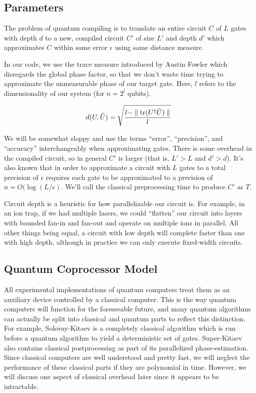 \subsection{Parameters}

The problem of quantum compiling is to translate
an entire circuit $C$ of $L$ gates with depth
$d$ to a new, compiled circuit $C'$ of size $L'$ and depth $d'$ which approximates
$C$ within some error $\epsilon$ using some distance measure.

In our code, we use the trace measure introduced by Austin Fowler which disregards
the global phase factor, so that we don't waste time trying to approximate
the unmeasurable phase of our target gate. Here,
$l$ refers to the dimensionality
of our system (for $n = 2^l$ qubits).

\begin{equation}
d(U,\tilde{U}) = \sqrt{\frac{l - \parallel \mathrm{tr}(U^\dagger \tilde{U}) \parallel}{l}}
\end{equation}

We will be somewhat sloppy and use the terms ``error'', ``precision'', and
``accuracy'' interchangeably when approximating gates.
There is some overhead in the compiled circuit, so in
general $C'$ is larger (that is, $L' > L$ and $d' > d$). It's also known that
in order to approximate a circuit with $L$ gates to a total precision of
$\epsilon$
requires each gate to be approximated to a precision of
$n = O(\log(L/\epsilon)$. We'll call the classical preprocessing time to
produce $C'$ as $T$.
 
Circuit depth is a heuristic for how parallelizable our
circuit is. For example, in an ion trap, if we had multiple lasers,
we could ``flatten'' our circuit into layers with bounded fan-in and
fan-out and operate on multiple ions in parallel.
All other things being equal, a circuit with low depth will complete
faster than one with high depth, although in practice we can only execute
fixed-width circuits.

\subsection{Quantum Coprocessor Model}

All experimental implementations of quantum computers treat them as an
auxiliary device controlled by a classical computer. This is the way
quantum computers will function for the foreseeable future, and many
quantum algorithms can actually be split into classical and quantum parts
to reflect this distinction. For example,
Solovay-Kitaev is a completely classical algorithm which is run before
a quantum algorithm to yield a deterministic set of gates. Super-Kitaev
also contains classical postprocessing as part of its parallelized
phase-estimation. Since classical computers are well understood and
pretty fast, we will neglect the performance of these classical parts
if they are polynomial in time. However, we will discuss one aspect
of classical overhead later since it appears to be intractable.

